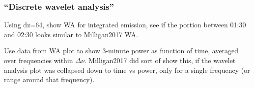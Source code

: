 \subsubsection{``Discrete wavelet analysis''}
Using dz=64, show WA for integrated emission, see if the portion between
01:30 and 02:30 looks similar to Milligan2017 WA.

Use data from WA plot to
show 3-minute power as function of time, averaged over frequencies within
$\Delta\nu$.
Milligan2017 did sort of show this,
if the wavelet analysis plot was collapsed down to time vs power, only for a
single frequency (or range around that frequency).



